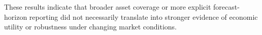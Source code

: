 \documentclass[pdflatex,sn-mathphys-num]{sn-jnl}%
\theoremstyle{thmstyleone}%
\theoremstyle{thmstyletwo}%
\theoremstyle{thmstylethree}%
\begin{document}
These results indicate that broader asset coverage or more explicit
forecast-horizon reporting did not necessarily translate into stronger
evidence of economic utility or robustness under changing market
conditions.





\end{document}
